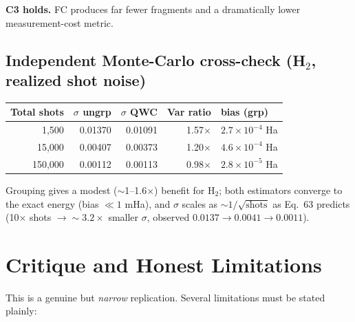 \documentclass[11pt]{article}
\begin{document}
\textbf{C3 holds.} FC produces far fewer fragments and a dramatically lower
measurement-cost metric.

\subsection*{Independent Monte-Carlo cross-check (H$_2$, realized shot noise)}

\begin{center}
\begin{tabular}{rrrrl}
\toprule
Total shots & $\sigma$ ungrp & $\sigma$ QWC & Var ratio & bias (grp) \\
\midrule
1{,}500   & 0.01370 & 0.01091 & 1.57$\times$ & $2.7\!\times\!10^{-4}$ Ha \\
15{,}000  & 0.00407 & 0.00373 & 1.20$\times$ & $4.6\!\times\!10^{-4}$ Ha \\
150{,}000 & 0.00112 & 0.00113 & 0.98$\times$ & $2.8\!\times\!10^{-5}$ Ha \\
\bottomrule
\end{tabular}
\end{center}

Grouping gives a modest ($\sim$1--1.6$\times$) benefit for H$_2$; both
estimators converge to the exact energy (bias $\ll 1$ mHa), and $\sigma$
scales as $\sim 1/\sqrt{\mathrm{shots}}$ as Eq.~63 predicts
(10$\times$ shots $\to \sim 3.2\times$ smaller $\sigma$, observed
$0.0137 \to 0.0041 \to 0.0011$).

\section{Critique and Honest Limitations}

This is a genuine but \emph{narrow} replication. Several limitations must be
stated plainly:
\end{document}

